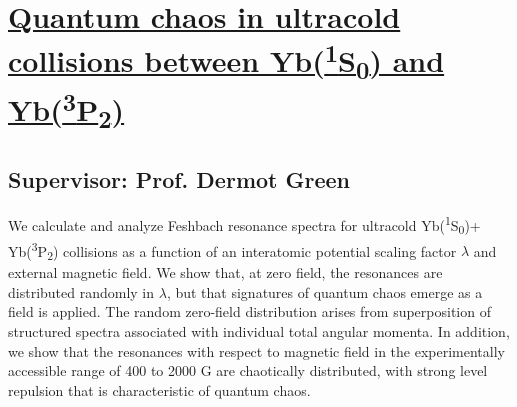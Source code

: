 \section{\href{https://doi.org/10.1103/PhysRevA.93.022703}{Quantum chaos in 
ultracold collisions between Yb(\textsuperscript{1}S\textsubscript{0}) and 
Yb(\textsuperscript{3}P\textsubscript{2})}}

 \subsection*{Supervisor: Prof. Dermot Green}


We calculate and analyze Feshbach resonance spectra for ultracold 
Yb(\textsuperscript{1}S\textsubscript{0})+ Yb(\textsuperscript{3}P\textsubscript{2}) collisions as a function of an interatomic 
potential scaling factor $\lambda$ and external magnetic field. We show that, at zero 
field, the resonances are distributed randomly in $\lambda$, but that 
signatures of quantum chaos emerge as a field is applied. The random 
zero-field distribution arises from superposition of structured spectra 
associated with individual total angular momenta. In addition, we show that 
the resonances with respect to magnetic field in the experimentally accessible 
range of 400 to 2000 G are chaotically distributed, with strong level repulsion 
that is characteristic of quantum chaos.
